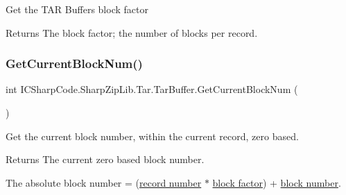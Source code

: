 Get the T\+AR Buffer\textquotesingle{}s block factor 

\begin{DoxyReturn}{Returns}
The block factor; the number of blocks per record.
\end{DoxyReturn}
\mbox{\label{class_i_c_sharp_code_1_1_sharp_zip_lib_1_1_tar_1_1_tar_buffer_ac45071c45a41ad084cb7331bf4f1b22c}} 
\subsubsection{\texorpdfstring{Get\+Current\+Block\+Num()}{GetCurrentBlockNum()}}
{\footnotesize\ttfamily int I\+C\+Sharp\+Code.\+Sharp\+Zip\+Lib.\+Tar.\+Tar\+Buffer.\+Get\+Current\+Block\+Num (\begin{DoxyParamCaption}{ }\end{DoxyParamCaption})\hspace{0.3cm}{\ttfamily [inline]}}



Get the current block number, within the current record, zero based. 

\begin{DoxyReturn}{Returns}
The current zero based block number. 
\end{DoxyReturn}


The absolute block number = (\hyperlink{class_i_c_sharp_code_1_1_sharp_zip_lib_1_1_tar_1_1_tar_buffer_a8a4a278e065e9fe09cc2e2047b04278e}{record number} $\ast$ \hyperlink{class_i_c_sharp_code_1_1_sharp_zip_lib_1_1_tar_1_1_tar_buffer_add6a353dfa4c8321ccd5a5e54b7d5958}{block factor}) + \hyperlink{class_i_c_sharp_code_1_1_sharp_zip_lib_1_1_tar_1_1_tar_buffer_ac45071c45a41ad084cb7331bf4f1b22c}{block number}. \mbox{\label{class_i_c_sharp_code_1_1_sharp_zip_lib_1_1_tar_1_1_tar_buffer_a8a4a278e065e9fe09cc2e2047b04278e}} 
